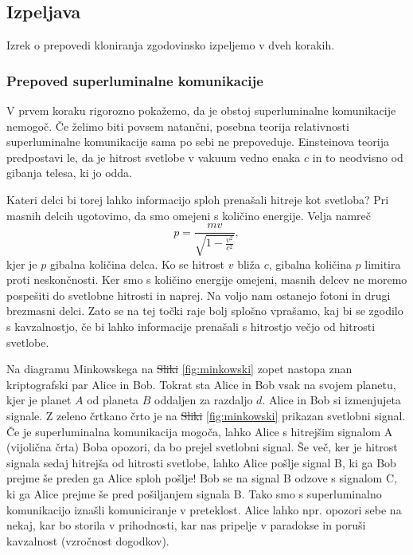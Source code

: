 \documentclass[12pt]{article}
\providecommand{\DIFadd}[1]{{\protect\color{blue}\uwave{#1}}} %
\providecommand{\DIFdel}[1]{{\protect\color{red}\sout{#1}}}                      %
\providecommand{\DIFaddbegin}{} %
\providecommand{\DIFaddend}{} %
\providecommand{\DIFdelbegin}{} %
\providecommand{\DIFdelend}{} %
\newcommand{\DIFscaledelfig}{0.5}
\newlength{\DIFdelgraphicswidth} %
\newlength{\DIFdelgraphicsheight} %
\newcommand{\DIFaddincludegraphics}[2][]{{\color{blue}\fbox{\DIFOincludegraphics[#1]{#2}}}} %
\newcommand{\DIFdelincludegraphics}[2][]{%
\sbox{\DIFdelgraphicsbox}{\DIFOincludegraphics[#1]{#2}}%
\settoboxwidth{\DIFdelgraphicswidth}{\DIFdelgraphicsbox} %
\settoboxtotalheight{\DIFdelgraphicsheight}{\DIFdelgraphicsbox} %
\scalebox{\DIFscaledelfig}{%
\parbox[b]{\DIFdelgraphicswidth}{\usebox{\DIFdelgraphicsbox}\\[-\baselineskip] \rule{\DIFdelgraphicswidth}{0em}}\llap{\resizebox{\DIFdelgraphicswidth}{\DIFdelgraphicsheight}{%
\setlength{\unitlength}{\DIFdelgraphicswidth}%
\begin{picture}(1,1)%
\thicklines\linethickness{2pt} %
{\color[rgb]{1,0,0}\put(0,0){\framebox(1,1){}}}%
{\color[rgb]{1,0,0}\put(0,0){\line( 1,1){1}}}%
{\color[rgb]{1,0,0}\put(0,1){\line(1,-1){1}}}%
\end{picture}%
}\hspace*{3pt}}} %
} %
\DeclareRobustCommand{\DIFaddbegin}{\DIFOaddbegin \let\includegraphics\DIFaddincludegraphics} %
\DeclareRobustCommand{\DIFaddend}{\DIFOaddend \let\includegraphics\DIFOincludegraphics} %
\DeclareRobustCommand{\DIFdelbegin}{\DIFOdelbegin \let\includegraphics\DIFdelincludegraphics} %
\DeclareRobustCommand{\DIFdelend}{\DIFOaddend \let\includegraphics\DIFOincludegraphics} %
\begin{document}
 \subsection{Izpeljava}
Izrek o prepovedi kloniranja zgodovinsko izpeljemo v dveh korakih. 
\subsubsection{Prepoved superluminalne komunikacije}
V prvem koraku rigorozno pokažemo, da je obstoj superluminalne komunikacije nemogoč. Če želimo biti povsem natančni, posebna teorija relativnosti superluminalne komunikacije sama po sebi ne prepoveduje. Einsteinova teorija predpostavi le, da je hitrost svetlobe v vakuum vedno enaka $c$ in to neodvisno od gibanja telesa, ki jo odda. \par Kateri delci bi torej lahko informacijo sploh prenašali hitreje kot svetloba? Pri masnih delcih ugotovimo, da smo omejeni s količino energije. Velja namreč
\begin{equation}
p = \frac{mv}{\sqrt{1-\frac{v^2}{c^2}}},
\end{equation}
kjer je $p$ gibalna količina delca. Ko se hitrost $v$ bliža $c$, gibalna količina $p$ limitira proti neskončnosti. Ker smo s količino energije omejeni, masnih delcev ne moremo pospešiti do svetlobne hitrosti in naprej. Na voljo nam ostanejo fotoni in drugi brezmasni delci. Zato se na tej točki raje bolj splošno vprašamo, kaj bi se zgodilo s kavzalnostjo, če bi lahko informacije prenašali s hitrostjo večjo od hitrosti svetlobe. \cite{marcocerezoEntangledParticlesFaster2015}
\par
Na diagramu Minkowskega na \DIFdelbegin \DIFdel{Sliki }\DIFdelend \DIFaddbegin \DIFadd{sliki }\DIFaddend \ref{fig:minkowski} zopet nastopa znan kriptografski par Alice in Bob. Tokrat sta Alice in Bob vsak na svojem planetu, kjer je planet $A$ od planeta $B$ oddaljen za razdaljo $d$. Alice in Bob si izmenjujeta signale. Z zeleno črtkano črto je na \DIFdelbegin \DIFdel{Sliki }\DIFdelend \DIFaddbegin \DIFadd{sliki }\DIFaddend \ref{fig:minkowski} prikazan svetlobni signal. Če je superluminalna komunikacija mogoča, lahko Alice s hitrejšim signalom A (vijolična črta) Boba opozori, da bo prejel svetlobni signal. Še več, ker je hitrost signala sedaj hitrejša od hitrosti svetlobe, lahko Alice pošlje signal B, ki ga Bob prejme še preden ga Alice sploh pošlje! Bob se na signal B odzove s signalom C, ki ga Alice prejme še pred pošiljanjem signala B. Tako smo s superluminalno komunikacijo iznašli komuniciranje v preteklost. Alice lahko npr. opozori sebe na nekaj, kar bo storila v prihodnosti, kar nas pripelje v paradokse in poruši kavzalnost (vzročnost dogodkov). \cite{marcocerezoEntangledParticlesFaster2015}
\end{document}
